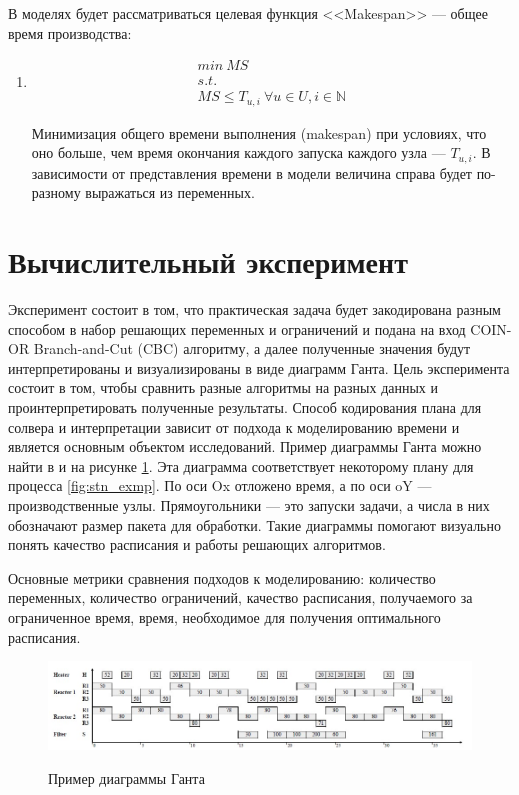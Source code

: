 \documentclass[12pt, twoside]{article}
\theoremstyle{definition}
\begin{document}
В моделях будет рассматриваться целевая функция <<Makespan>> --- общее время производства:
\begin{enumerate}
\item
\begin{equation}
\begin{gathered}
	min \: MS\\
	s.t.\\
	MS \leq T_{u, i} \: \forall u \in U, i \in \mathbb{N}
\end{gathered}
\end{equation}

Минимизация общего времени выполнения (makespan) при условиях, что оно больше, чем время окончания каждого запуска каждого узла --- $T_{u, i}$. В зависимости от представления времени в модели величина справа будет по-разному выражаться из переменных.

\end{enumerate}

\section{Вычислительный эксперимент}

Эксперимент состоит в том, что практическая задача будет закодирована разным способом в набор решающих переменных и ограничений и подана на вход COIN-OR Branch-and-Cut (CBC) алгоритму, а далее полученные значения будут интерпретированы и визуализированы в виде диаграмм Ганта. Цель эксперимента состоит в том, чтобы сравнить разные алгоритмы на разных данных и проинтерпретировать полученные результаты. Способ кодирования плана для солвера и интерпретации зависит от подхода к моделированию времени и является основным объектом исследований. Пример диаграммы Ганта можно найти в \cite{discretetime} и на рисунке \ref{fig:gannt_example}. Эта диаграмма соответствует некоторому плану для процесса \ref{fig:stn_exmp}. По оси Ox отложено время, а по оси oY --- производственные узлы. Прямоугольники --- это запуски задачи, а числа в них обозначают размер пакета для обработки. Такие диаграммы помогают визуально понять качество расписания и работы решающих алгоритмов. 

Основные метрики сравнения подходов к моделированию: количество переменных, количество ограничений, качество расписания, получаемого за ограниченное время, время, необходимое для получения оптимального расписания.

\begin{figure}[h]
\caption{Пример диаграммы Ганта}
\centering
\includegraphics[width=1.0\textwidth]{диаграмма ганта}
\label{fig:gannt_example}
\end{figure}
\end{document}
